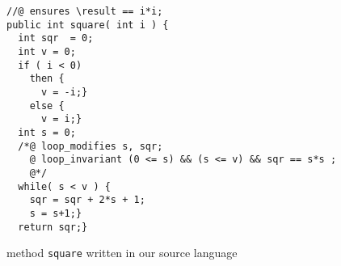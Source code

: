 \begin{figure}[ht!]
 \begin{lstlisting}[frame=trbl] 
//@ ensures \result == i*i; 
public int square( int i ) {
  int sqr  = 0;
  int v = 0;
  if ( i < 0)
    then {
      v = -i;} 
    else {
      v = i;}
  int s = 0;
  /*@ loop_modifies s, sqr;
    @ loop_invariant (0 <= s) && (s <= v) && sqr == s*s ;
    @*/
  while( s < v ) {
    sqr = sqr + 2*s + 1;
    s = s+1;}
  return sqr;}
\end{lstlisting}
\caption{\sc method  \lstinline!square! written in our source language}
\label{pogComp:source:example}

\end{figure}

